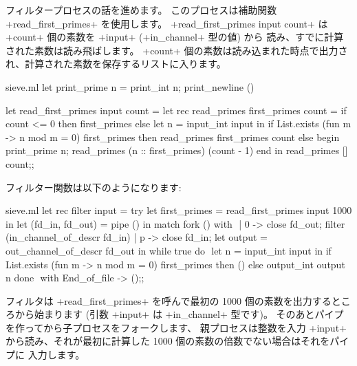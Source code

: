 フィルタープロセスの話を進めます。
このプロセスは補助関数 \ml+read_first_primes+ を使用します。
\ml+read_first_primes input count+ は \ml+count+ 個の素数を \ml+input+ (\ml+in_channel+ 型の値) から
読み、すでに計算された素数は読み飛ばします。
\ml+count+ 個の素数は読み込まれた時点で出力され、計算された素数を保存するリストに入ります。
%
\begin{listingcodefile}[style=numbers]{sieve.ml}
let print_prime n = print_int n; print_newline ()

let read_first_primes input count =
  let rec read_primes first_primes count =
    if count <= 0 then first_primes else
    let n = input_int input in
    if List.exists (fun m -> n mod m = 0) first_primes then
      read_primes first_primes count
    else begin
      print_prime n;
      read_primes (n :: first_primes) (count - 1)
    end
  in
  read_primes [] count$\label{prog:pprime}$;;
\end{listingcodefile}
%
フィルター関数は以下のようになります:
%
\begin{listingcodefile}[style=numbers]{sieve.ml}
let rec filter input =
  try
    let first_primes = read_first_primes input 1000 in
    let (fd_in, fd_out) = pipe () in
    match fork () with $\label{prog:sievefilterfork}$
    | 0 ->
        close fd_out;
        filter (in_channel_of_descr fd_in)
    | p ->
        close fd_in;
        let output = out_channel_of_descr fd_out in
        while true do $\label{prog:sievefilterwhile}$
          let n = input_int input in
          if List.exists (fun m -> n mod m = 0) first_primes then ()
          else output_int output n
        done $\label{prog:sievefilterdone}$
  with End_of_file -> ();;
\end{listingcodefile}
%
フィルタは \ml+read_first_primes+ を呼んで最初の 1000 個の素数を出力するところから始まります
(引数 \ml+input+ は \ml+in_channel+ 型です)。
そのあとパイプを作ってから子プロセスをフォークします、
親プロセスは整数を入力 \ml+input+ から読み、それが最初に計算した 1000 個の素数の倍数でない場合はそれをパイプに
入力します。

